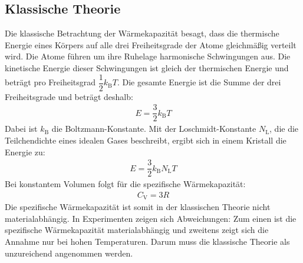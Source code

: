 \subsection{Klassische Theorie}
\label{sec:Klasische Theorie}
Die klassische Betrachtung der Wärmekapazität besagt, dass die thermische Energie eines Körpers auf alle drei Freiheitsgrade der Atome gleichmäßig verteilt wird. Die Atome führen um ihre Ruhelage harmonische Schwingungen aus. Die kinetische Energie dieser Schwingungen ist gleich der thermischen Energie und beträgt pro Freiheitsgrad $\dfrac{1}{2}k_\mathrm{B}T$. Die gesamte Energie ist die Summe der drei Freiheitsgrade und beträgt deshalb:
\begin{align}
  \label{eqn:klassische Energie}
 E = \dfrac{3}{2}k_\mathrm{B}T
\end{align}
Dabei ist $k_\mathrm{B}$ die Boltzmann-Konstante. Mit der Loschmidt-Konstante $N_\mathrm{L}$, die die Teilchendichte eines idealen Gases beschreibt, ergibt sich in einem Kristall die Energie zu:
\begin{align}
  \label{eqn:Energie im Kristallk}
 E = \dfrac{3}{2}k_\mathrm{B}N_\mathrm{L}T
\end{align}
Bei konstantem Volumen folgt für die spezifische Wärmekapazität:
\begin{align}
  \label{eqn:3R}
 C_\mathrm{V} = 3R
\end{align}
Die spezifische Wärmekapazität ist somit in der klassischen Theorie nicht materialabhängig. In Experimenten zeigen sich Abweichungen: Zum einen ist die spezifische Wärmekapazität materialabhängig und zweitens zeigt sich die Annahme nur bei hohen Temperaturen. Darum muss die klassische Theorie als unzureichend angenommen werden.
